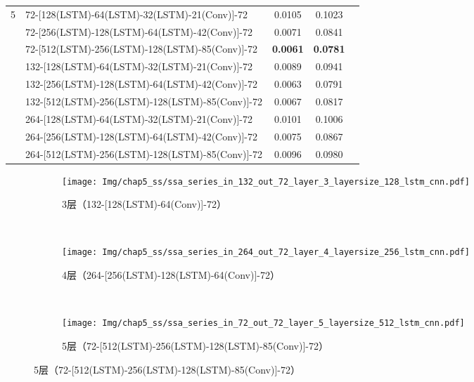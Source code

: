 \begin{table}[!htbp]
\begin{tabular}{clccc}
    5 & 72-[128(LSTM)-64(LSTM)-32(LSTM)-21(Conv)]-72 & 0.0105 & 0.1023 \\
      & 72-[256(LSTM)-128(LSTM)-64(LSTM)-42(Conv)]-72 & 0.0071 & 0.0841 \\
      & 72-[512(LSTM)-256(LSTM)-128(LSTM)-85(Conv)]-72 & \textbf{0.0061} & \textbf{0.0781} \\
      & 132-[128(LSTM)-64(LSTM)-32(LSTM)-21(Conv)]-72 & 0.0089 & 0.0941 \\
      & 132-[256(LSTM)-128(LSTM)-64(LSTM)-42(Conv)]-72 & 0.0063 & 0.0791 \\
      & 132-[512(LSTM)-256(LSTM)-128(LSTM)-85(Conv)]-72 & 0.0067 & 0.0817 \\
      & 264-[128(LSTM)-64(LSTM)-32(LSTM)-21(Conv)]-72 & 0.0101 & 0.1006 \\
      & 264-[256(LSTM)-128(LSTM)-64(LSTM)-42(Conv)]-72 & 0.0075 & 0.0867 \\
      & 264-[512(LSTM)-256(LSTM)-128(LSTM)-85(Conv)]-72 & 0.0096 & 0.0980 \\
    \bottomrule
\end{tabular}
\end{table}

\begin{figure}[!htbp]
  \centering
  \begin{subfigure}[b]{1.0\textwidth}
    \caption{3层（132-[128(LSTM)-64(Conv)]-72）} 
    \vspace{-0.35cm}
    \texttt{[image: Img/chap5\_ss/ssa\_series\_in\_132\_out\_72\_layer\_3\_layersize\_128\_lstm\_cnn.pdf]}
    \label{fig:ssa_series_in_132_out_72_layer_3_layersize_128_lstm_cnn}
  \end{subfigure}    \\
  \vspace{-1cm}
  \begin{subfigure}[b]{1.0\textwidth}
    \caption{4层（264-[256(LSTM)-128(LSTM)-64(Conv)]-72）}
    \vspace{-0.35cm}
    \texttt{[image: Img/chap5\_ss/ssa\_series\_in\_264\_out\_72\_layer\_4\_layersize\_256\_lstm\_cnn.pdf]}
    \label{fig:ssa_series_in_264_out_72_layer_4_layersize_256_lstm_cnn}
  \end{subfigure} \\
  \vspace{-1cm}
  \begin{subfigure}[b]{1.0\textwidth}
    \caption{5层（72-[512(LSTM)-256(LSTM)-128(LSTM)-85(Conv)]-72）}
    \vspace{-0.35cm}
    \texttt{[image: Img/chap5\_ss/ssa\_series\_in\_72\_out\_72\_layer\_5\_layersize\_512\_lstm\_cnn.pdf]}
    \label{fig:ssa_series_in_72_out_72_layer_5_layersize_512_lstm_cnn}
    \end{subfigure}
  \vspace{-2cm}
  \label{fig:ssa_series_out_72_lstm_cnn}
\end{figure}

